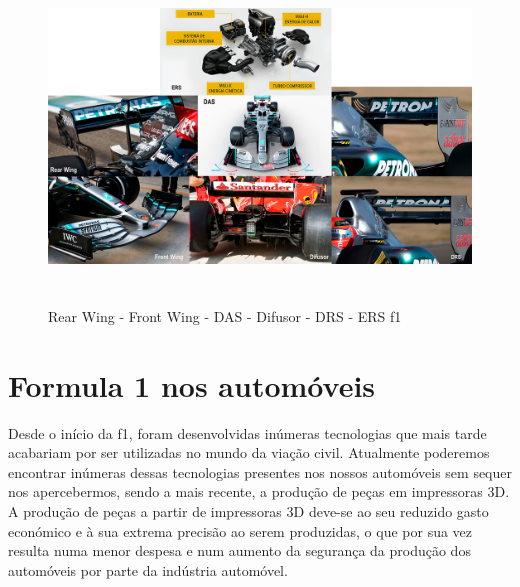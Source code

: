 \documentclass{report}
\begin{document}
\begin{itemize}
\begin{figure}[h]
\center %
\includegraphics[height=250pt]{carro}
\caption{Rear Wing - Front Wing - DAS - Difusor - DRS - ERS \ac{f1}}
\label{fig:carro}
\end{figure}

\end{itemize}

\chapter{Formula 1 nos automóveis}
Desde o início da \ac{f1}, foram desenvolvidas inúmeras tecnologias que mais tarde acabariam por ser utilizadas no mundo da viação civil. Atualmente poderemos encontrar inúmeras dessas tecnologias presentes nos nossos automóveis sem sequer nos apercebermos, sendo a mais recente, a produção de peças em impressoras 3D. A produção de peças a partir de impressoras 3D deve-se ao seu reduzido gasto económico e à sua extrema precisão ao serem produzidas, o que por sua vez resulta numa menor despesa e num aumento da segurança da produção dos automóveis por parte da indústria automóvel.
\end{document}
